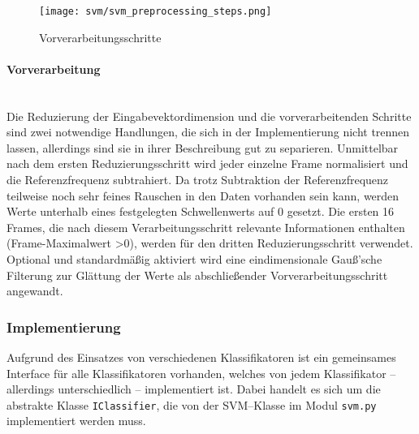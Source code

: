 \begin{figure*}[htbp] \centering
    \texttt{[image: svm/svm\_preprocessing\_steps.png]}
    \caption{Vorverarbeitungsschritte}
    \label{fig:svm_preprocessing_steps}
\end{figure*}

\paragraph{Vorverarbeitung}\label{sec:svm_preprocess}$\;$ \\\\
Die Reduzierung der Eingabevektordimension und die vorverarbeitenden Schritte sind zwei notwendige Handlungen, die sich in der Implementierung nicht trennen lassen, allerdings sind sie in ihrer Beschreibung gut zu separieren.
Unmittelbar nach dem ersten Reduzierungsschritt wird jeder einzelne Frame normalisiert und die Referenzfrequenz subtrahiert.
Da trotz Subtraktion der Referenzfrequenz teilweise noch sehr feines Rauschen in den Daten vorhanden sein kann, werden Werte unterhalb eines festgelegten Schwellenwerts auf 0 gesetzt.
Die ersten 16 Frames, die nach diesem Verarbeitungsschritt relevante Informationen enthalten (Frame-Maximalwert \textgreater 0), werden für den dritten Reduzierungsschritt verwendet.
Optional und standardmäßig aktiviert wird eine eindimensionale Gauß'sche Filterung zur Glättung der Werte als abschließender Vorverarbeitungsschritt angewandt.

\subsubsection{Implementierung}\label{sec:svm_implementation}
Aufgrund des Einsatzes von verschiedenen Klassifikatoren ist ein gemeinsames Interface für alle Klassifikatoren vorhanden, welches von jedem Klassifikator -- allerdings unterschiedlich -- implementiert ist. 
Dabei handelt es sich um die abstrakte Klasse \texttt{IClassifier}, die von der \ac{SVM}--Klasse im Modul \texttt{svm.py}  implementiert werden muss.

